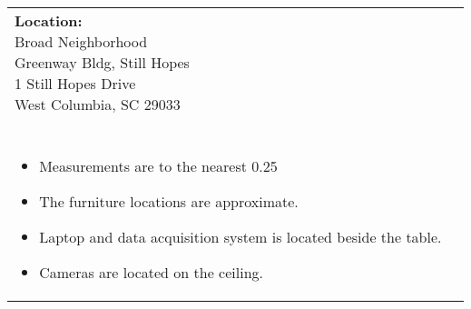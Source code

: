 \documentclass[12pt]{article}
\begin{document}
\begin{figure}[H]
\begin{tikzpicture}[scale=1/14,  %
                            rotate=0]
    
    \end{tikzpicture}
    \end{figure}
    
    \vspace*{\fill}  %
    \begin{table}[H]
	\begin{tabular}{l l}
		\makecell[lt]{
			\textbf{Location:}\\
     		Broad Neighborhood \\
 		    Greenway Bldg, Still Hopes\\
           	1 Still Hopes Drive\\
           	West Columbia, SC 29033\\\\
        }   	
        &	
		\makecell[tp{5in}]{
		\textbf{Notes:}\\
		\vspace{-8mm}  %
		\begin{itemize}
			\setlength\itemsep{-3mm}  %
			\item Measurements are to the nearest \SI{0.25}{\inch}
			\item The furniture locations are approximate.
			\item Laptop and data acquisition system is located beside the table.
			\item Cameras are located on the ceiling.
		\end{itemize}
		}	
			
	\end{tabular}
	\vspace{-8mm} %
\end{table}

    
\end{document}
